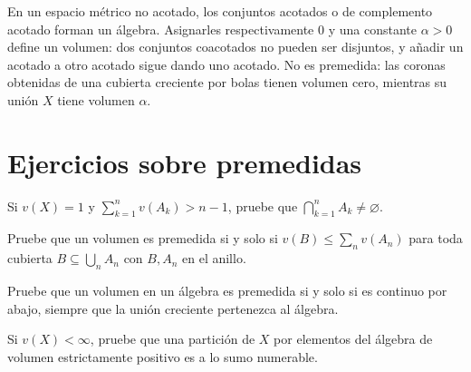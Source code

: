 En un espacio métrico no acotado, los conjuntos acotados o de complemento acotado forman un álgebra. Asignarles respectivamente $0$ y una constante $\alpha>0$ define un volumen: dos conjuntos coacotados no pueden ser disjuntos, y añadir un acotado a otro acotado sigue dando uno acotado. No es premedida: las coronas obtenidas de una cubierta creciente por bolas tienen volumen cero, mientras su unión $X$ tiene volumen $\alpha$.

\section{Ejercicios sobre premedidas}
\begin{ejercicio}\label{ej:v2-l05-1}
Si $v(X)=1$ y $\sum_{k=1}^nv(A_k)>n-1$, pruebe que $\bigcap_{k=1}^nA_k\ne\varnothing$.
\end{ejercicio}

\begin{ejercicio}\label{ej:v2-l05-2}
Pruebe que un volumen es premedida si y solo si $v(B)\le\sum_nv(A_n)$ para toda cubierta $B\subseteq\bigcup_nA_n$ con $B,A_n$ en el anillo.
\end{ejercicio}

\begin{ejercicio}\label{ej:v2-l05-3}
Pruebe que un volumen en un álgebra es premedida si y solo si es continuo por abajo, siempre que la unión creciente pertenezca al álgebra.
\end{ejercicio}

\begin{ejercicio}\label{ej:v2-l05-4}
Si $v(X)<\infty$, pruebe que una partición de $X$ por elementos del álgebra de volumen estrictamente positivo es a lo sumo numerable.
\end{ejercicio}


